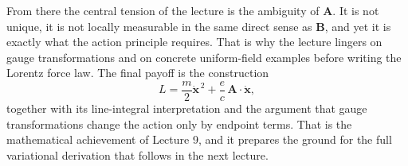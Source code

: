 From there the central tension of the lecture is the ambiguity of \(\mathbf A\). It is not unique, it is not locally measurable in the same direct sense as \(\mathbf B\), and yet it is exactly what the action principle requires. That is why the lecture lingers on gauge transformations and on concrete uniform-field examples before writing the Lorentz force law. The final payoff is the construction
\[
L=\frac{m}{2}\dot{\mathbf x}^{\,2}+\frac{e}{c}\,\mathbf A\cdot\dot{\mathbf x},
\]
together with its line-integral interpretation and the argument that gauge transformations change the action only by endpoint terms. That is the mathematical achievement of Lecture 9, and it prepares the ground for the full variational derivation that follows in the next lecture.